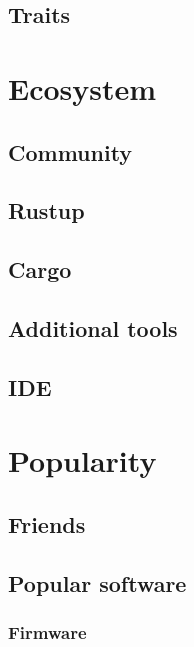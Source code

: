 \documentclass[%
final,
xcolor = table,
usenames,
dvipsnames,
table,
aspectratio = 169]{beamer}
\begin{document}
\subsection{Traits}



\section{Ecosystem}
\subsection{Community}


\subsection{Rustup}

\subsection{Cargo}


\subsection{Additional tools}


\subsection{IDE}


\section{Popularity}

\subsection{Friends}

\subsection{Popular software}

\subsubsection{Firmware}
\end{document}
